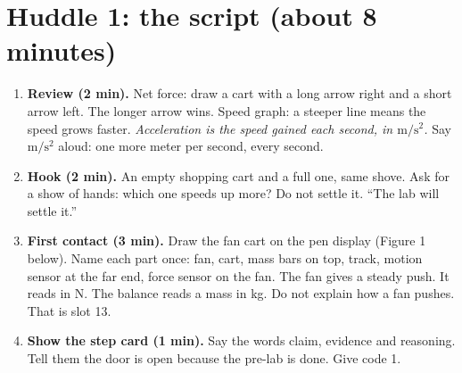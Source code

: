 \documentclass[10pt]{article}
\begin{document}
\section{Huddle 1: the script (about 8 minutes)}
\begin{enumerate}
\item \textbf{Review (2 min).} Net force: draw a cart with a long arrow right and a short arrow left. The longer arrow wins. Speed graph: a steeper line means the speed grows faster. \textit{Acceleration is the speed gained each second, in \ensuremath{\mathrm{m/s^2}}.} Say \ensuremath{\mathrm{m/s^2}} aloud: one more meter per second, every second.
\item \textbf{Hook (2 min).} An empty shopping cart and a full one, same shove. Ask for a show of hands: which one speeds up more? Do not settle it. “The lab will settle it.”
\item \textbf{First contact (3 min).} Draw the fan cart on the pen display (Figure 1 below). Name each part once: fan, cart, mass bars on top, track, motion sensor at the far end, force sensor on the fan. The fan gives a steady push. It reads in N. The balance reads a mass in kg. Do not explain how a fan pushes. That is slot 13.
\item \textbf{Show the step card (1 min).} Say the words claim, evidence and reasoning. Tell them the door is open because the pre-lab is done. Give code 1.
\end{enumerate}
\end{document}
